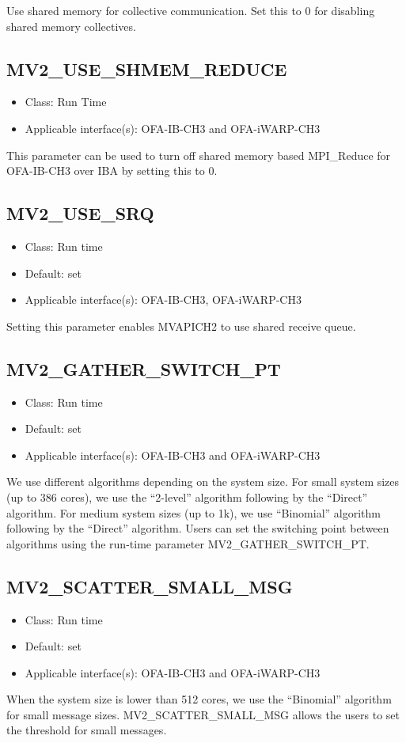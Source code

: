 Use shared memory for collective communication. Set this to 0 for
disabling shared memory collectives.


\subsection{MV2\_USE\_SHMEM\_REDUCE}
\label{def:mv2-use-shmem-reduce}
\begin{itemize}
		\item Class: Run Time
    \item Applicable interface(s): OFA-IB-CH3 and OFA-iWARP-CH3
\end{itemize}
This parameter can be used to turn off shared memory based
MPI\_Reduce for OFA-IB-CH3 over IBA by setting this to 0.


\subsection{MV2\_USE\_SRQ}
\begin{itemize}
    \item Class: Run time
    \item Default: set
    \item Applicable interface(s): OFA-IB-CH3, OFA-iWARP-CH3
\end{itemize}
Setting this parameter enables MVAPICH2 to use shared receive queue.

\subsection{MV2\_GATHER\_SWITCH\_PT}
\label{def:mv2_gather_switch_pt}
\begin{itemize}
    \item Class: Run time 
    \item Default: set
    \item Applicable interface(s): OFA-IB-CH3 and OFA-iWARP-CH3
\end{itemize}
We use different algorithms depending on the system size. For small system sizes (up to 386 cores), we use 
the ``2-level'' algorithm following by the ``Direct'' algorithm. 
For medium system sizes (up to 1k), we use ``Binomial'' algorithm following by the ``Direct'' algorithm. 
Users can set the switching point between algorithms using the run-time parameter MV2\_GATHER\_SWITCH\_PT.

\subsection{MV2\_SCATTER\_SMALL\_MSG}
\label{def:mv2_scatter_small_msg}
\begin{itemize}
    \item Class: Run time
    \item Default: set
    \item Applicable interface(s): OFA-IB-CH3 and OFA-iWARP-CH3
\end{itemize}
When the system size is lower than 512 cores, we use the ``Binomial'' algorithm for small message sizes.
MV2\_SCATTER\_SMALL\_MSG allows the users to set the threshold for small messages.
                                                           
